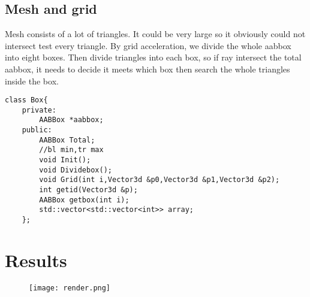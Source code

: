 \documentclass[acmtog]{acmart}
\begin{document}
\subsection{Mesh and grid} Mesh consists of a lot of triangles. It could be very large so it obviously could not intersect test every triangle. By grid acceleration, we divide the whole aabbox into eight boxes. Then divide triangles into each box, so if ray intersect the total aabbox, it needs to decide it meets which box then search the whole triangles inside the box.
\begin{lstlisting}
class Box{
    private:
        AABBox *aabbox;
    public:
        AABBox Total;
        //bl min,tr max
        void Init();
        void Dividebox();
        void Grid(int i,Vector3d &p0,Vector3d &p1,Vector3d &p2);
        int getid(Vector3d &p);
        AABBox getbox(int i);
        std::vector<std::vector<int>> array;
    };
\end{lstlisting}
\section{Results}
\begin{figure}[htpb]
    \centering
    \texttt{[image: render.png]}\\
    \label{fig:result1}
\end{figure}
\end{document}

